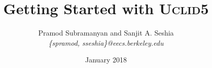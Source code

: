 \documentclass[oneside]{scrbook}
\newcommand{\uclid}{\textsc{Uclid5}}
\begin{document}
\title{Getting Started with \uclid{}}
\author{Pramod Subramanyan and Sanjit A. Seshia \\
        \textit{\{spramod, sseshia\}@eecs.berkeley.edu}}
\date{January 2018}
\maketitle

\tableofcontents
\listofuclidlisting





\appendix

\end{document}
